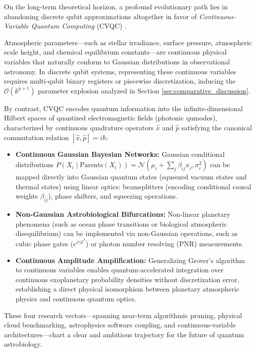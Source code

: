 On the long-term theoretical horizon, a profound evolutionary path lies in abandoning discrete qubit approximations altogether in favor of \emph{Continuous-Variable Quantum Computing} (CVQC) \cite{weedbrook2012}.

Atmospheric parameters—such as stellar irradiance, surface pressure, atmospheric scale height, and chemical equilibrium constants—are continuous physical variables that naturally conform to Gaussian distributions in observational astronomy. In discrete qubit systems, representing these continuous variables requires multi-qubit binary registers or piecewise discretization, inducing the $\mathcal{O}(k^{p+1})$ parameter explosion analyzed in Section \ref{sec:comparative_discussion}.

By contrast, CVQC encodes quantum information into the infinite-dimensional Hilbert spaces of quantized electromagnetic fields (photonic qumodes), characterized by continuous quadrature operators $\hat{x}$ and $\hat{p}$ satisfying the canonical commutation relation $[\hat{x}, \hat{p}] = i\hbar$:
\begin{itemize}
    \item \textbf{Continuous Gaussian Bayesian Networks:} Gaussian conditional distributions $P(X_i \mid \mathrm{Parents}(X_i)) = \mathcal{N}(\mu_i + \sum_j \beta_{ij} x_j, \sigma_i^2)$ can be mapped directly into Gaussian quantum states (squeezed vacuum states and thermal states) using linear optics: beamsplitters (encoding conditional causal weights $\beta_{ij}$), phase shifters, and squeezing operations.
    \item \textbf{Non-Gaussian Astrobiological Bifurcations:} Non-linear planetary phenomena (such as ocean phase transitions or biological atmospheric disequilibrium) can be implemented via non-Gaussian operations, such as cubic phase gates ($e^{i \gamma \hat{x}^3}$) or photon number resolving (PNR) measurements.
    \item \textbf{Continuous Amplitude Amplification:} Generalizing Grover's algorithm to continuous variables enables quantum-accelerated integration over continuous exoplanetary probability densities without discretization error, establishing a direct physical isomorphism between planetary atmospheric physics and continuous quantum optics.
\end{itemize}

These four research vectors—spanning near-term algorithmic pruning, physical cloud benchmarking, astrophysics software coupling, and continuous-variable architectures—chart a clear and ambitious trajectory for the future of quantum astrobiology.

